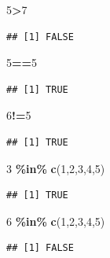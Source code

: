 \documentclass[
  a4paperpaper,
]{book}
\newenvironment{Shaded}{\begin{snugshade}}{\end{snugshade}}
\newcommand{\DecValTok}[1]{\textcolor[rgb]{0.00,0.00,0.81}{#1}}
\newcommand{\KeywordTok}[1]{\textcolor[rgb]{0.13,0.29,0.53}{\textbf{#1}}}
\newcommand{\NormalTok}[1]{#1}
\newcommand{\OperatorTok}[1]{\textcolor[rgb]{0.81,0.36,0.00}{\textbf{#1}}}
\newcommand{\StringTok}[1]{\textcolor[rgb]{0.31,0.60,0.02}{#1}}
\begin{document}
\begin{Shaded}
\begin{Highlighting}[]
\DecValTok{5}\OperatorTok{\textgreater{}}\DecValTok{7}
\end{Highlighting}
\end{Shaded}

\begin{verbatim}
## [1] FALSE
\end{verbatim}

\begin{Shaded}
\begin{Highlighting}[]
\DecValTok{5}\OperatorTok{==}\DecValTok{5}
\end{Highlighting}
\end{Shaded}

\begin{verbatim}
## [1] TRUE
\end{verbatim}

\begin{Shaded}
\begin{Highlighting}[]
\DecValTok{6}\OperatorTok{!=}\DecValTok{5}
\end{Highlighting}
\end{Shaded}

\begin{verbatim}
## [1] TRUE
\end{verbatim}

\begin{Shaded}
\begin{Highlighting}[]
\DecValTok{3} \OperatorTok{\%in\%}\StringTok{ }\KeywordTok{c}\NormalTok{(}\DecValTok{1}\NormalTok{,}\DecValTok{2}\NormalTok{,}\DecValTok{3}\NormalTok{,}\DecValTok{4}\NormalTok{,}\DecValTok{5}\NormalTok{)}
\end{Highlighting}
\end{Shaded}

\begin{verbatim}
## [1] TRUE
\end{verbatim}

\begin{Shaded}
\begin{Highlighting}[]
\DecValTok{6} \OperatorTok{\%in\%}\StringTok{ }\KeywordTok{c}\NormalTok{(}\DecValTok{1}\NormalTok{,}\DecValTok{2}\NormalTok{,}\DecValTok{3}\NormalTok{,}\DecValTok{4}\NormalTok{,}\DecValTok{5}\NormalTok{)}
\end{Highlighting}
\end{Shaded}

\begin{verbatim}
## [1] FALSE
\end{verbatim}
\end{document}
